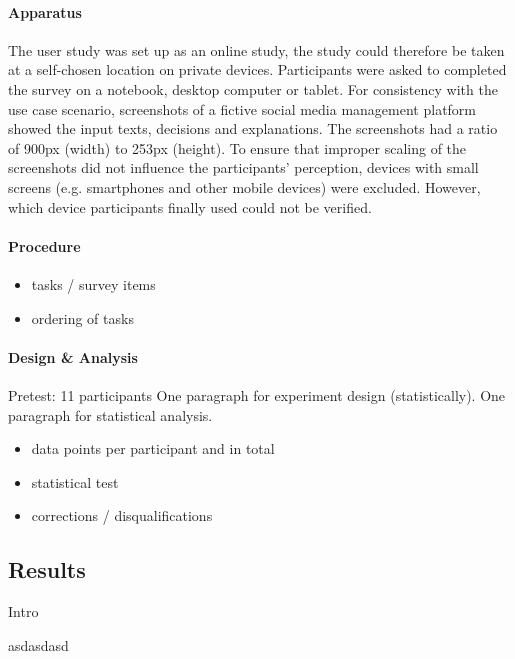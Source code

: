 \paragraph{Apparatus}
The user study was set up as an online study, the study could therefore be taken at a self-chosen location on private devices. Participants were asked to completed the survey on a notebook, desktop computer or tablet. For consistency with the use case scenario, screenshots of a fictive social media management platform showed the input texts, decisions and explanations. The screenshots had a ratio of 900px (width) to 253px (height). To ensure that improper scaling of the screenshots did not influence the participants' perception, devices with small screens (e.g. smartphones and other mobile devices) were excluded. However, which device participants finally used could not be verified.

\paragraph{Procedure}
\begin{itemize}
	\item tasks / survey items
	\item ordering of tasks
\end{itemize}

\paragraph{Design \& Analysis}
Pretest: 11 participants
One paragraph for experiment design (statistically).\medskip\newline
One paragraph for statistical analysis.\newline
\begin{itemize}
	\item data points per participant and in total
	\item statistical test
	\item corrections / disqualifications
\end{itemize}


\subsection{Results}
Intro \newline

asdasdasd